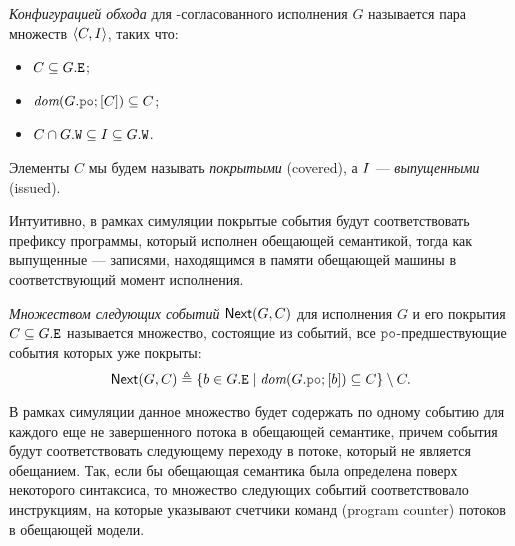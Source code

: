 \begin{definition}
\emph{Конфигурацией обхода} для \ARM-согласованного исполнения $G$ называется пара множеств ${\langle{C, I}\rangle}$, таких что:
\begin{itemize}
  \item $C \subseteq G.{\mathtt{E}}$;
  \item $\dom{G.\lPO;[C]}\suq C$;
  \item $C \cap G.{\mathtt{W}} \subseteq I \subseteq G.{\mathtt{W}}$.
\end{itemize}
Элементы $C$ мы будем называть \emph{покрытыми} (covered), а $I$ --- \emph{выпущенными} (issued).
\end{definition}
Интуитивно, в рамках симуляции покрытые события будут соответствовать префиксу программы,
который исполнен обещающей семантикой, тогда как выпущенные --- записями, находящимся в памяти обещающей машины
в соответствующий момент исполнения.
\begin{definition}
  \emph{Множеством следующих событий} ${\sf Next}(G, C)$ для исполнения $G$ и его покрытия $C \subseteq G.{\mathtt{E}}$
  называется множество, состоящие из событий, все $\lPO$-предшествующие события которых уже покрыты:
  \[\nextset(G, C) \defeq \{b \in G.\lE \mid \dom{G.\lPO;[b]} \suq C\} \setminus C.\]
\end{definition}
В рамках симуляции данное множество будет содержать по одному событию для каждого еще не завершенного потока
в обещающей семантике, причем события будут соответствовать следующему переходу в потоке, который не является обещанием.
Так, если бы обещающая семантика была определена поверх некоторого синтаксиса, то множество
следующих событий соответствовало инструкциям, на которые указывают счетчики команд (program counter) потоков
в обещающей модели.

